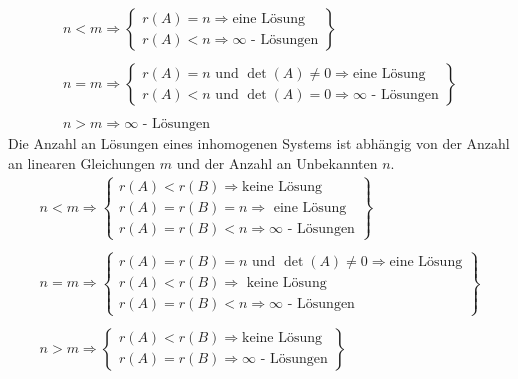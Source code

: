 \begin{equation} 
\boxed{
\begin{array}{l}
n<m\Rightarrow\left\{
\begin{matrix}r(A)=n\Rightarrow\text{eine Lösung}\\r(A)<n\Rightarrow\infty\text{ - Lösungen}\end{matrix}\right\}\\\\
n=m\Rightarrow\left\{
\begin{matrix}r(A)=n \text{ und } \det(A)\neq 0\Rightarrow\text{eine Lösung}\\r(A)<n \text{ und } \det(A)=0\Rightarrow\infty\text{ - Lösungen}\end{matrix}\right\}\\\\
n>m\Rightarrow \infty\text{ - Lösungen}
\end{array}
}
\end{equation}
Die Anzahl an Lösungen eines inhomogenen Systems ist abhängig von der Anzahl an linearen Gleichungen $m$ und der Anzahl an Unbekannten $n$.
\begin{equation} 
\boxed{
\begin{array}{l}
n<m\Rightarrow\left\{
\begin{matrix}r(A)<r(B)\Rightarrow\text{keine Lösung}\\r(A)=r(B)=n\Rightarrow\text{ eine Lösung}\\r(A)=r(B)<n\Rightarrow\infty\text{ - Lösungen}\end{matrix}\right\}\\\\
n=m\Rightarrow\left\{
\begin{matrix}r(A)=r(B)=n \text{ und } \det(A)\neq 0\Rightarrow\text{eine Lösung}\\r(A)<r(B) \Rightarrow\text{ keine Lösung}\\r(A)=r(B)<n \Rightarrow\infty\text{ - Lösungen}\end{matrix}\right\}\\\\
n>m\Rightarrow\left\{
\begin{matrix}r(A)<r(B) \Rightarrow\text{keine Lösung}\\r(A)=r(B) \Rightarrow\infty\text{ - Lösungen}\end{matrix}\right\}\\\\
\end{array}
}
\end{equation} 
